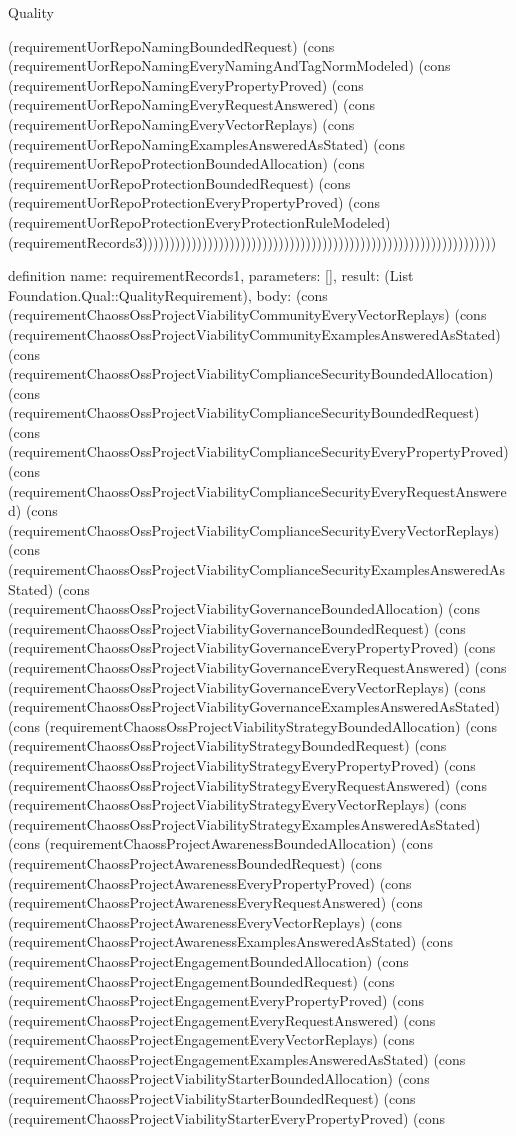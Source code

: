 \begin{lexlean}{Quality}
\begin{semanticmodule}
{(requirementUorRepoNamingBoundedRequest) (cons (requirementUorRepoNamingEveryNamingAndTagNormModeled) (cons (requirementUorRepoNamingEveryPropertyProved) (cons (requirementUorRepoNamingEveryRequestAnswered) (cons (requirementUorRepoNamingEveryVectorReplays) (cons (requirementUorRepoNamingExamplesAnsweredAsStated) (cons (requirementUorRepoProtectionBoundedAllocation) (cons (requirementUorRepoProtectionBoundedRequest) (cons (requirementUorRepoProtectionEveryPropertyProved) (cons (requirementUorRepoProtectionEveryProtectionRuleModeled) (requirementRecords3)))))))))))))))))))))))))))))))))))))))))))))))))))))))))))))))))
}

definition{
  name: requirementRecords1,
  parameters: [],
  result: (List Foundation.Qual::QualityRequirement),
  body: (cons (requirementChaossOssProjectViabilityCommunityEveryVectorReplays) (cons (requirementChaossOssProjectViabilityCommunityExamplesAnsweredAsStated) (cons (requirementChaossOssProjectViabilityComplianceSecurityBoundedAllocation) (cons (requirementChaossOssProjectViabilityComplianceSecurityBoundedRequest) (cons (requirementChaossOssProjectViabilityComplianceSecurityEveryPropertyProved) (cons (requirementChaossOssProjectViabilityComplianceSecurityEveryRequestAnswered) (cons (requirementChaossOssProjectViabilityComplianceSecurityEveryVectorReplays) (cons (requirementChaossOssProjectViabilityComplianceSecurityExamplesAnsweredAsStated) (cons (requirementChaossOssProjectViabilityGovernanceBoundedAllocation) (cons (requirementChaossOssProjectViabilityGovernanceBoundedRequest) (cons (requirementChaossOssProjectViabilityGovernanceEveryPropertyProved) (cons (requirementChaossOssProjectViabilityGovernanceEveryRequestAnswered) (cons (requirementChaossOssProjectViabilityGovernanceEveryVectorReplays) (cons (requirementChaossOssProjectViabilityGovernanceExamplesAnsweredAsStated) (cons (requirementChaossOssProjectViabilityStrategyBoundedAllocation) (cons (requirementChaossOssProjectViabilityStrategyBoundedRequest) (cons (requirementChaossOssProjectViabilityStrategyEveryPropertyProved) (cons (requirementChaossOssProjectViabilityStrategyEveryRequestAnswered) (cons (requirementChaossOssProjectViabilityStrategyEveryVectorReplays) (cons (requirementChaossOssProjectViabilityStrategyExamplesAnsweredAsStated) (cons (requirementChaossProjectAwarenessBoundedAllocation) (cons (requirementChaossProjectAwarenessBoundedRequest) (cons (requirementChaossProjectAwarenessEveryPropertyProved) (cons (requirementChaossProjectAwarenessEveryRequestAnswered) (cons (requirementChaossProjectAwarenessEveryVectorReplays) (cons (requirementChaossProjectAwarenessExamplesAnsweredAsStated) (cons (requirementChaossProjectEngagementBoundedAllocation) (cons (requirementChaossProjectEngagementBoundedRequest) (cons (requirementChaossProjectEngagementEveryPropertyProved) (cons (requirementChaossProjectEngagementEveryRequestAnswered) (cons (requirementChaossProjectEngagementEveryVectorReplays) (cons (requirementChaossProjectEngagementExamplesAnsweredAsStated) (cons (requirementChaossProjectViabilityStarterBoundedAllocation) (cons (requirementChaossProjectViabilityStarterBoundedRequest) (cons (requirementChaossProjectViabilityStarterEveryPropertyProved) (cons }
\end{semanticmodule}
\end{lexlean}
